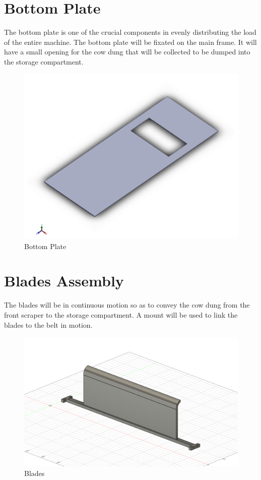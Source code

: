 \section{Bottom Plate} \label{Bottom Plate}
The bottom plate is one of the crucial components in evenly distributing the load of the entire machine. The bottom plate will be fixated on the main frame. It will have a small opening for the cow dung that will be collected to be dumped into the storage compartment. 
\begin{figure}[H]
\center
\includegraphics[scale=0.3]{BottomPlate}
\caption{Bottom Plate}
\end{figure}


\section{Blades Assembly} \label{Blades Assembly}

The blades will be in continuous motion so as to convey the cow dung from the front scraper to the storage compartment. A mount will be used to link the blades to the belt in motion. 
\begin{figure}[H]
\center
\includegraphics[scale=0.3]{BladeonMount}
\caption{Blades}
\end{figure}





